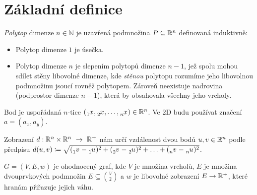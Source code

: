 \chapter*{Základní definice}
\label{sec:zakladni-pojmy}

\begin{definition}[Polytop]
  \emph{Polytop} dimenze $n \in \mathbb{N}$ je uzavřená podmnožina $P \subseteq \mathbb{R}^{n}$ definovaná induktivně:
  \begin{itemize}
    \item Polytop dimenze $1$ je úsečka.
    \item Polytop dimenze $n$ je slepením polytopů dimenze $n-1$, jež spolu mohou
          sdílet stěny libovolné dimenze, kde \emph{stěnou} polytopu rozumíme jeho
          libovolnou podmnožinu jsoucí rovněž polytopem.
          Zároveň neexistuje nadrovina (podprostor dimenze $n - 1$), která by obsahovala všechny jeho vrcholy.
          \autocite{adamklepacDefinicePolytopu2024}
  \end{itemize}

\end{definition}

\begin{definition}[Bod]
  \label{definice:bod}
  Bod je uspořádaná $n$-tice $(\xx{1}, \xx{2}, \ldots, \xx{n}) \in \R^n$. Ve $2$D budu používat značení $a=(a_x, a_y)$.
\end{definition}

\begin{definition}[Vzdálenost]
  \label{definice:vzdalenost}
  Zobrazení $d: \mathbb{R}^n\times \mathbb{R}^n~\rightarrow~\mathbb{R}^+$ nám určí vzdálenost dvou bodů $u, v \in \mathbb{R}^n$
  podle předpisu $d(u, v) \coloneqq \sqrt{(\vvv{1}-\uu{1})^2+(\vvv{2}-\uu{2})^2+\ldots+(\vvv{n}-\uu{n})^2}$.
\end{definition}

\begin{definition}
  \label{definice:ohodnoceny_graf}
  $G = (V, E, w)$ je ohodnocený graf, kde $V$ je množina vrcholů, $E$ je množina dvouprvkových podmnožin $E \subseteq \binom{V}{2}$ a $w$ je libovolné zobrazení $E \rightarrow \mathbb{R}^+$, které hranám přiřazuje jejich váhu.
\end{definition}

